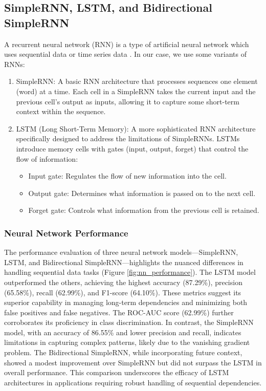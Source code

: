 \documentclass{article}
\begin{document}
\subsection*{SimpleRNN, LSTM, and Bidirectional SimpleRNN}
A recurrent neural network (RNN) is a type of artificial neural network which uses sequential data or time series data \cite{ibm-rnn}. In our case, we use some variants of RNNs:
\begin{enumerate}
    \item SimpleRNN: A basic RNN architecture that processes sequences one element (word) at a time. Each cell in a SimpleRNN takes the current input and the previous cell's output as inputs, allowing it to capture some short-term context within the sequence.
    \item LSTM (Long Short-Term Memory): A more sophisticated RNN architecture specifically designed to address the limitations of SimpleRNNs. LSTMs introduce memory cells with gates (input, output, forget) that control the flow of information:
        \begin{itemize}
            \item Input gate: Regulates the flow of new information into the cell.
            \item Output gate: Determines what information is passed on to the next cell.
            \item Forget gate: Controls what information from the previous cell is retained.
        \end{itemize}
\end{enumerate}

\subsubsection*{Neural Network Performance}
The performance evaluation of three neural network models—SimpleRNN, LSTM, and Bidirectional SimpleRNN—highlights the nuanced differences in handling sequential data tasks (Figure \ref{fig:nn_performance}). The LSTM model outperformed the others, achieving the highest accuracy (87.29\%), precision (65.58\%), recall (62.99\%), and F1-score (64.10\%). These metrics suggest its superior capability in managing long-term dependencies and minimizing both false positives and false negatives. The ROC-AUC score (62.99\%) further corroborates its proficiency in class discrimination. In contrast, the SimpleRNN model, with an accuracy of 86.55\% and lower precision and recall, indicates limitations in capturing complex patterns, likely due to the vanishing gradient problem. The Bidirectional SimpleRNN, while incorporating future context, showed a modest improvement over SimpleRNN but did not surpass the LSTM in overall performance. This comparison underscores the efficacy of LSTM architectures in applications requiring robust handling of sequential dependencies.
\end{document}
